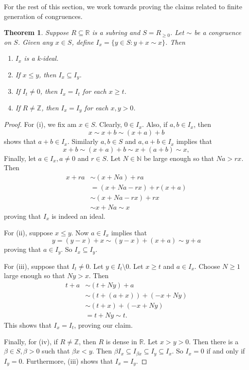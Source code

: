 \documentclass[notitlepage, 10pt]{article}
\theoremstyle{defin}
\theoremstyle{theo}
\newtheorem{thm}[defn]{Theorem}
\theoremstyle{rema}
\newcommand{\R}{\mathbb{R}}
\newcommand{\N}{\mathbb{N}}
\newcommand{\Z}{\mathbb{Z}}
\begin{document}
For the rest of this section, we work towards proving the claims related to finite generation of congruences. 

\begin{thm}\label{t:fin}
    Suppose $R\subseteq \R$ is a subring and $S=R_{\geq 0}$. Let $\sim$ be a congruence on $S$. Given any $x\in S$, define $I_x = \{y\in S : y+x\sim x\}$. Then
    \begin{enumerate}
        \item $I_x$ is a k-ideal.
        \item If $x\leq y$, then $I_x\subseteq I_y$.
        \item If $I_t\neq 0$, then $I_x=I_t$ for each $x\geq t$.
        \item If $R\neq \Z$, then $I_x=I_y$ for each $x,y>0$.
    \end{enumerate}
\end{thm}

\begin{proof}

For (i), we fix am $x\in S$. Clearly, $0\in I_x$. Also, if $a,b\in I_x$, then
    $$x\sim x+b \sim (x+a)+b$$
    shows that $a+b\in I_x$. Similarly $a,b\in S$ and $a, a+b\in I_x$ implies that
    $$x+b \sim (x+a)+b \sim x+(a+b) \sim x,$$
   Finally, let $a\in I_x, a\neq 0$ and $r\in S$. Let $N\in \N$ be large enough so that $Na>rx$. Then 
    \begin{align*}
        x+ra&\sim (x+Na)+ra \\
        &= (x+Na-rx)+r(x+a)\\
        &\sim (x+Na-rx)+rx \\
        &\sim x+Na \sim x
    \end{align*}
    proving that $I_x$ is indeed an ideal. 
    
    For (ii), suppose $x\leq y$. Now $a\in I_x$ implies that 
    $$y = (y-x)+x \sim (y-x)+(x+a) \sim y+a$$
    proving that $a\in I_y$. So $I_x\subseteq I_y$.

    For (iii), suppose that $I_t\neq 0$. Let $y\in I_t\setminus 0$. Let $x\geq t$ and $a\in I_x$. Choose $N\geq 1$ large enough so that $Ny>x$. Then 
    \begin{align*}
   t+a &\sim (t+Ny)+a \\
   &\sim (t+ (a+x)) + (-x+Ny) \\
   &\sim (t+x) + (-x+Ny) \\
   &=t+Ny \sim t.
    \end{align*}
   This shows that $I_x=I_t$, proving our claim.

   Finally, for (iv), if $R\neq \Z$, then $R$ is dense in $\R$. Let $x>y>0$. Then there is a $\beta\in S, \beta >0$ such that $\beta x<y$. Then $\beta I_x \subseteq I_{\beta x} \subseteq I_y \subseteq I_x$. So $I_x=0$ if and only if $I_y=0$. Furthermore, (iii) shows that $I_x=I_y$.
\end{proof}
\end{document}
